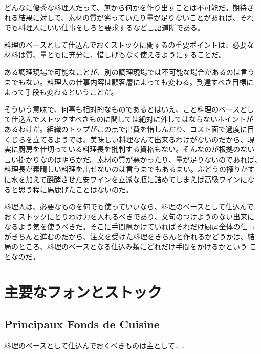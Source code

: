 どんなに優秀な料理人だって、無から何かを作り出すことは不可能だ。期待さ
れる結果に対して、素材の質が劣っていたり量が足りないことがあれば、それ
でも料理人にいい仕事をしろと要求するなど言語道断である。

料理のベースとして仕込んでおくストックに関するの重要ポイントは、必要な
材料は質、量ともに充分に、惜しげもなく使えるようにすることだ。

ある調理現場で可能なことが、別の調理現場では不可能な場合があるのは言う
までもない。料理人の仕事内容は顧客層によっても変わる。到達すべき目標に
よって手段も変わるということだ。

そういう意味で、何事も相対的なものであるとはいえ、こと料理のベースとし
て仕込んでストックすべきものに関しては絶対に外してはならないポイントが
あるわけだ。組織のトップがこの点で出費を惜しんだり、コスト面で過度に目
くじらを立てるようでは、美味しい料理なんて出来るわけがないのだから、現
実に厨房を仕切っている料理長を批判する資格もない。そんなのが根拠のない
言い掛かりなのは明らかだ。素材の質が悪かったり、量が足りないのであれば、
料理長が素晴しい料理を出せないのは言うまでもあるまい。ぶどうの搾りかす
に水を加えて醗酵させた安ワインを立派な瓶に詰めてしまえば高級ワインにな
ると思う程に馬鹿げたことはないのだ。

料理人は、必要なものを何でも使っていいなら、料理のベースとして仕込んで
おくストックにとりわけ力を入れるべきであり、文句のつけようのない出来に
なるよう気を使うべきだ。そこに手間隙かけていればそれだけ厨房全体の仕事
がきちんと進むのだから、注文を受けた料理をきちんと作れるかどうかは、結
局のところ、料理のベースとなる仕込み類にどれだけ手間をかけるかという
ことなのだ。

\hypertarget{principauxfondsdecuisine}{%
\section{主要なフォンとストック}\label{principauxfondsdecuisine}}

\hypertarget{principaux-fonds-de-cuisine}{%
\subsection{Principaux Fonds de
Cuisine}\label{principaux-fonds-de-cuisine}}

料理のベースとして仕込んでおくべきものは主として\ldots{}\ldots{}

